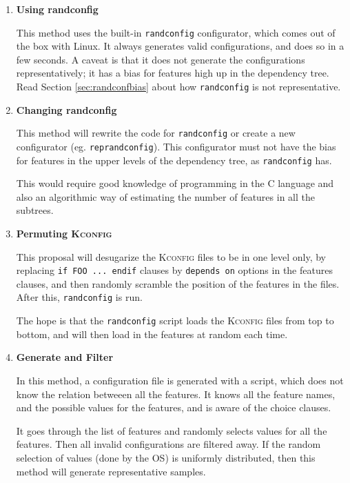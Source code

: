 \documentclass[a4paper,11pt]{report}
\newcommand{\textcode}[1]{\fboxsep=1pt\texttt{\colorbox{gray!20}{#1}}}
\begin{document}
\begin{enumerate}

    \item \textbf{Using randconfig}

This method uses the built-in \texttt{randconfig} configurator, which comes out 
of the box with Linux. It always generates valid configurations,
and does so in a few seconds. A caveat is that it does not generate the 
configurations representatively; it has a bias for features high up in the 
dependency tree.  Read Section \ref{sec:randconfbias} about how 
\texttt{randconfig} is not representative.


    \item \textbf{Changing randconfig}

This method will rewrite the code for \texttt{randconfig} or create a new 
configurator (eg. \texttt{reprandconfig}).  This configurator must not have the 
bias for features in the upper levels of the dependency tree, as 
\texttt{randconfig} has.

This would require good knowledge of programming in the \textsc{C} language
and also an algorithmic way of estimating the number of features in all the 
subtrees.


    \item \textbf{Permuting \textsc{Kconfig}}


This proposal will desugarize the \textsc{Kconfig} files to be in one level 
only, by replacing \textcode{if FOO ... endif} clauses by \textcode{depends on} 
options in the features clauses, and then randomly scramble the position of 
the features in the files. After this, \texttt{randconfig} is run.

The hope is that the \texttt{randconfig} script loads the \textsc{Kconfig} 
files from top to bottom, and will then load in the features at random each 
time.


    \item \textbf{Generate and Filter}

            \def \fn {It also is aware about \texttt{choice} clauses}

In this method, a configuration file is generated with a script, which 
does not know the relation betweeen all the features. It knows all the feature
names, and the possible values for the features, and is aware of the choice 
clauses.

It goes through the list of features and randomly selects values for all the features. Then 
all invalid configurations are filtered away. If the random selection of values (done by the OS) is uniformly 
distributed, then this method will generate representative samples.



\end{enumerate}
\end{document}
